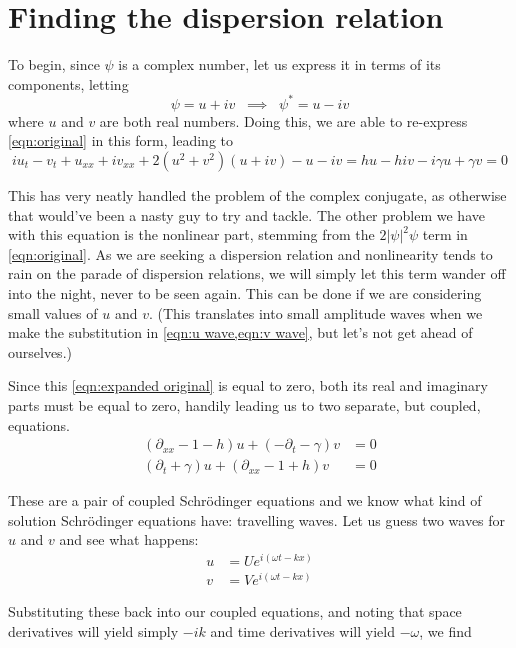 \documentclass[11pt]{article}
\numberwithin{equation}{section}
\numberwithin{figure}{section}
\numberwithin{table}{section}
\begin{document}
\section{Finding the dispersion relation}\label{sec:Dispersion}
\par To begin, since $\psi$ is a complex number, let us express it in terms of its components, letting 
\begin{equation}
    \psi = u+iv\;\;\implies\;\; \psi^*=u-iv
\end{equation}
where $u$ and $v$ are both real numbers. Doing this, we are able to re-express \cref{eqn:original} in this form, leading to
\begin{equation}
    iu_t-v_t+u_{xx}+iv_{xx}+2(u^2+v^2)(u+iv)-u-iv=hu-hiv-i\gamma u+\gamma v=0
    \label{eqn:expanded original}
\end{equation}
\par This has very neatly handled the problem of the complex conjugate, as otherwise that would've been a nasty guy to try and tackle. The other problem we have with this equation is the nonlinear part, stemming from the $2|\psi|^2\psi$ term in \cref{eqn:original}. As we are seeking a dispersion relation and nonlinearity tends to rain on the parade of dispersion relations, we will simply let this term wander off into the night, never to be seen again. This can be done if we are considering small values of $u$ and $v$. (This translates into small amplitude waves when we make the substitution in \cref{eqn:u wave,eqn:v wave}, but let's not get ahead of ourselves.)
\par Since this \cref{eqn:expanded original} is equal to zero, both its real and imaginary parts must be equal to zero, handily leading us to two separate, but coupled, equations. 
\begin{align}
    (\partial_{xx}-1-h)u+(-\partial_t-\gamma)v&=0\\
    (\partial_t+\gamma)u+(\partial_{xx}-1+h)v&=0
\end{align}
\par These are a pair of coupled Schr\"odinger equations and we know what kind of solution Schr\"odinger equations have: travelling waves. Let us guess two waves for $u$ and $v$ and see what happens:
\begin{align}
    u&=Ue^{i(\omega t-kx)}\label{eqn:u wave}\\
    v&=Ve^{i(\omega t-kx)}\label{eqn:v wave}
\end{align}
\par Substituting these back into our coupled equations, and noting that space derivatives will yield simply $-ik$ and time derivatives will yield $-\omega$, we find
\end{document}
